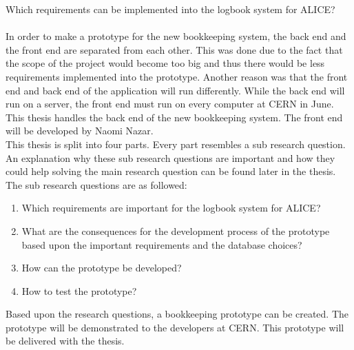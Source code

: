 \documentclass[paper=a4, fontsize=11pt,twoside]{scrartcl}	%
\begin{document}
Which requirements can be implemented into the logbook system for ALICE?
\\ \\
In order to make a prototype for the new bookkeeping system, the back end and the front end are separated from each other. This was done due to the fact that the scope of the project would become too big and thus there would be less requirements implemented into the prototype. Another reason was that the front end and back end of the application will run differently. While the back end will run on a server, the front end must run on every computer at CERN in June. This thesis handles the back end of the new bookkeeping system. The front end will be developed by Naomi Nazar. 
\\ 
This thesis is split into four parts. Every part resembles a sub research question. An explanation why these sub research questions are important and how they could help solving the main research question can be found later in the thesis. The sub research questions are as followed: \\
\begin{enumerate}
\item Which requirements are important for the logbook system for ALICE?
\item What are the consequences for the development process of the prototype based upon the important requirements and the database choices?
\item How can the prototype be developed?
\item How to test the prototype?
\end{enumerate}
Based upon the research questions, a bookkeeping prototype can be created. The prototype will be demonstrated to the developers at CERN. This prototype will be delivered with the thesis. 

 


\end{document}
